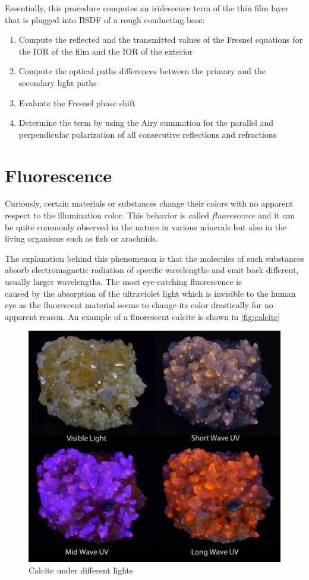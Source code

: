 Essentially, this procedure computes an iridescence term of the thin film layer that is plugged into BSDF of a rough conducting base:

\begin{enumerate}
	\item Compute the reflected and the transmitted values of the Fresnel equations for the IOR of the film and the IOR of the exterior
	\item Compute the optical paths differences between the primary and the secondary light paths
	\item Evaluate the Fresnel phase shift
	\item Determine the term by using the Airy summation for the parallel and perpendicular polarization of all consecutive reflections and refractions
\end{enumerate}

\section{Fluorescence}

Curiously, certain materials or substances change their colors with no apparent respect to the illumination color. This behavior is called \emph{fluorescence} and it can be quite commonly observed in the nature in various minerals but also in the living organisms such as fish or arachnids.

The explanation behind this phenomenon is that the molecules of such substances absorb electromagnetic radiation of specific wavelengths and emit back different, usually larger wavelengths. The most eye-catching fluorescence is \\caused by the absorption of the ultraviolet light which is invisible to the human eye as the fluorescent material seems to change its color drastically for no apparent reason. An example of a fluorescent calcite is shown in \autoref{fig:calcite}

\begin{figure}
	\centering
	\includegraphics[width=0.8\linewidth]{img/calcite.png}
	\caption[calcite]{Calcite under different lights\footnotemark}
	\label{fig:calcite}
\end{figure}

